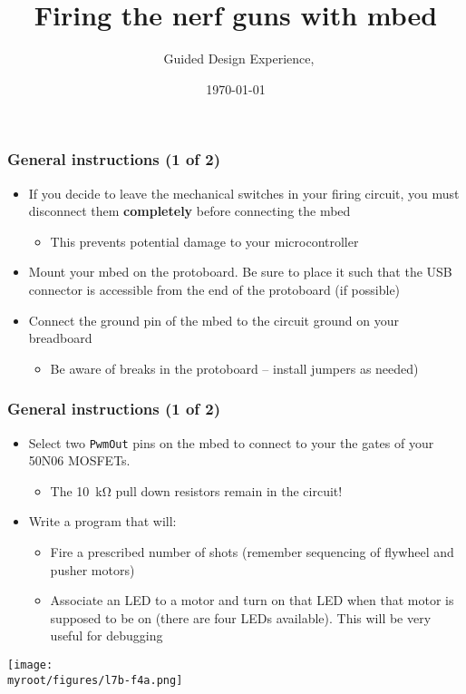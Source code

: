 \documentclass[aspectratio=169]{beamer}
\title{Firing the nerf guns with mbed}
\subtitle{\usnaCourseNumber\ Guided Design Experience, \usnaCourseTerm}
\author{\usnaInstructorShort}
\date{\today}
\newcommand{\myroot}{../..}
\begin{document}
\settitlebg
\begin{frame}
\titlepage
\end{frame}

\setslidebg
\begin{frame}
\frametitle{General instructions (1 of 2)}
\begin{itemize}
\item If you decide to leave the mechanical switches in your firing circuit, you must disconnect them \textbf{completely} before connecting the mbed
\begin{itemize}
\item This prevents potential damage to your microcontroller
\end{itemize}
\item Mount your mbed on the protoboard.  Be sure to place it such that the USB connector is accessible from the end of the protoboard (if possible)
\item Connect the ground pin of the mbed to the circuit ground on your breadboard
\begin{itemize}
\item Be aware of breaks in the protoboard -- install jumpers as needed)
\end{itemize}
\end{itemize}
\end{frame}

\begin{frame}
\frametitle{General instructions (1 of 2)}
\begin{itemize}
\item Select two \lstinline{PwmOut} pins on the mbed to connect to your the gates of your 50N06 MOSFETs.
\begin{itemize}
\item The \SI{10}{\kilo\ohm} pull down resistors remain in the circuit!
\end{itemize}
\item Write a program that will:
\begin{itemize}
\item Fire a prescribed number of shots (remember sequencing of flywheel and pusher motors)
\item Associate an LED to a motor and turn on that LED when that motor is supposed to be on (there are four LEDs available).  This will be very useful for debugging
\end{itemize}
\end{itemize}
\end{frame}

\begin{frame}
\begin{center}
\texttt{[image: \\myroot/figures/l7b-f4a.png]}

\end{center}
\end{frame}
\end{document}
